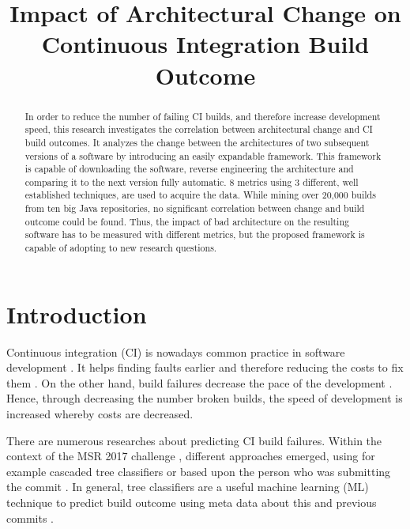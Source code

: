 \documentclass[conference]{IEEEtran}
\begin{document}
\title{Impact of Architectural Change on
	Continuous Integration Build Outcome\\
}

\author{
}

\maketitle

\begin{abstract}
In order to reduce the number of failing CI builds, and therefore increase development speed, this research investigates the correlation between architectural change and CI build outcomes. 
It analyzes the change between the architectures of two subsequent versions of a software by introducing an easily expandable framework.
This framework is capable of downloading the software, reverse engineering the architecture and comparing it to the next version fully automatic. 
8 metrics using 3 different, well established techniques, are used to acquire the data. While mining over 20,000 builds from ten big Java repositories, no significant correlation between change and build outcome could be found. 
Thus, the impact of bad architecture on the resulting software has to be measured with different metrics, but the proposed framework is capable of adopting to new research questions.
\end{abstract}

\section{Introduction}

Continuous integration (CI) is nowadays common practice in software development \cite{CI-Common}. It helps finding faults earlier and therefore reducing the costs to fix them \cite{NutzenCI}. On the other hand, build failures decrease the pace of the development \cite{Costs-BuildFailures}. Hence, through decreasing the number broken builds, the speed of development is increased whereby costs are decreased.

There are numerous researches about predicting CI build failures. Within the context of the MSR 2017 challenge \cite{TravisTorrent},  different approaches emerged, using for example cascaded tree classifiers \cite{Pred-Cascade} or based upon the person who was submitting the commit \cite{ContrInvolv}. In general, tree classifiers are a useful machine learning (ML) technique to predict build outcome using meta data about this and previous commits \cite{Pred-Tree, ML-Project}. 
\end{document}
